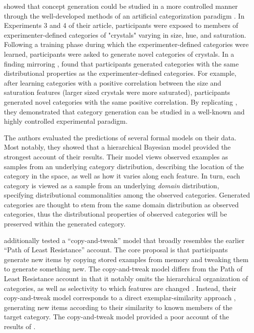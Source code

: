 \documentclass[pdflatex,sn-apa]{sn-jnl}%
\theoremstyle{thmstyleone}%
\theoremstyle{thmstyletwo}%
\theoremstyle{thmstylethree}%
\begin{document}
\cite{jern2013probabilistic} showed that concept generation could be
studied in a more controlled manner through the well-developed methods of an
artificial categorization paradigm \citep[see][for a review]{kurtz2015human}. In
Experiments 3 and 4 of their article, participants were exposed to members of
experimenter-defined categories of "crystals" varying in size, hue, and
saturation. Following a training phase during which the experimenter-defined
categories were learned, participants were asked to generate novel categories of
crystals. In a finding mirroring \cite{ward1994structured},
\cite{jern2013probabilistic} found that participants generated categories with
the same distributional properties as the experimenter-defined categories. For
example, after learning categories with a positive correlation between the size
and saturation features (larger sized crystals were more saturated),
participants generated novel categories with the same positive correlation. By
replicating \cite{ward1994structured}, they demonstrated that category generation
can be studied in a well-known and highly controlled experimental paradigm.

The authors evaluated the predictions of several formal models on their data.
Most notably, they showed that a hierarchical Bayesian model provided the
strongest account of their results. Their model views observed examples as
samples from an underlying category distribution, describing the location of the
category in the space, as well as how it varies along each feature. In turn,
each category is viewed as a sample from an underlying {\em domain}
distribution, specifying distributional commonalities among the observed
categories. Generated categories are thought to stem from the same domain
distribution as observed categories, thus the distributional properties of
observed categories will be preserved within the generated category. 

\cite{jern2013probabilistic} additionally tested a ``copy-and-tweak'' model that
broadly resembles the earlier ``Path of Least Resistance'' account. The core
proposal is that participants generate new items by copying stored examples from
memory and tweaking them to generate something new. The copy-and-tweak model
differs from the Path of Least Resistance account in that it notably omits the
hierarchical organization of categories, as well as selectivity to which
features are changed \citep[both of which are factors in the Path of Least
Resistance account;][]{ward2002role}. Instead, their copy-and-tweak model
corresponds to a direct exemplar-similarity approach
\citep[e.g.,][]{nosofsky1984choice,nosofsky1986attention}, generating new items
according to their similarity to known members of the target category. The
copy-and-tweak model provided a poor account of the results of \cite{jern2013probabilistic}. 
\end{document}
